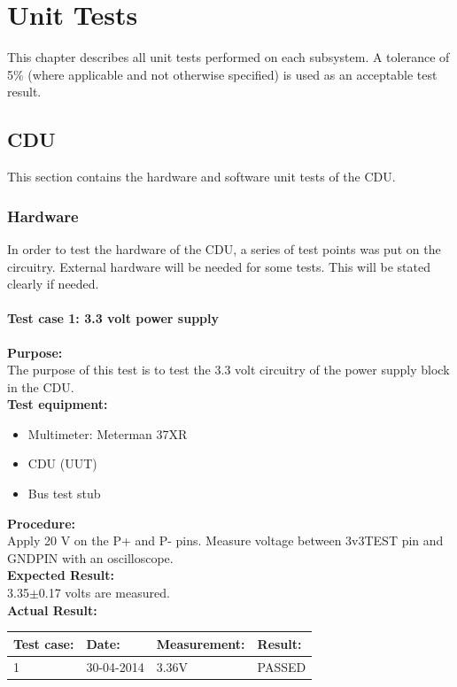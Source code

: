 \chapter{Unit Tests}
This chapter describes all unit tests performed on each subsystem. A tolerance of 5\% (where applicable and not otherwise specified) is used as an acceptable test result.
\section{CDU}
This section contains the hardware and software unit tests of the CDU.
\subsection{Hardware}
In order to test the hardware of the CDU, a series of test points was put on the circuitry. External hardware will be needed for some tests. This will be stated clearly if needed.
\subsubsection{Test case 1: 3.3 volt power supply}
\textbf{Purpose:}\\
The purpose of this test is to test the 3.3 volt circuitry of the power supply block in the CDU.\\

\textbf{Test equipment:}
\begin{itemize}
\item Multimeter: Meterman 37XR
\item CDU (UUT)
\item Bus test stub
\end{itemize}

\textbf{Procedure:}\\
Apply 20 V on the P+ and P- pins. Measure voltage between 3v3TEST pin and GNDPIN with an oscilloscope.\\

\textbf{Expected Result:}\\
3.35$\pm$0.17 volts are measured.\\

\textbf{Actual Result:}\\
\begin{table}[H]
\centering
\begin{tabular}{|p{2cm}|p{2cm}|p{3cm}|p{2cm}|}\hline
\textbf{Test case:} & \textbf{Date:} & \textbf{Measurement:} & \textbf{Result:} \\ \hline
1 & 30-04-2014 & 3.36V & PASSED \\ \hline
\end{tabular}
\end{table}

